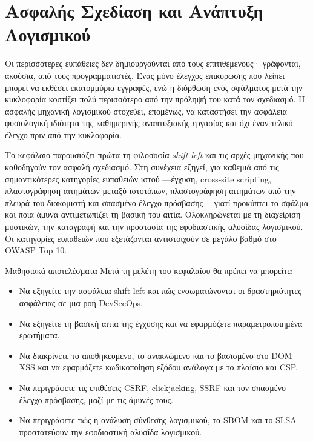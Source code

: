 \chapter{Ασφαλής Σχεδίαση και Ανάπτυξη Λογισμικού}\label{ch:9}

Οι περισσότερες ευπάθειες δεν δημιουργούνται από τους επιτιθέμενους· γράφονται, ακούσια, από τους προγραμματιστές. Ένας μόνο έλεγχος επικύρωσης που λείπει μπορεί να εκθέσει εκατομμύρια εγγραφές, ενώ η διόρθωση ενός σφάλματος μετά την κυκλοφορία κοστίζει πολύ περισσότερο από την πρόληψή του κατά τον σχεδιασμό. Η ασφαλής μηχανική λογισμικού στοχεύει, επομένως, να καταστήσει την ασφάλεια φυσιολογική ιδιότητα της καθημερινής αναπτυξιακής εργασίας και όχι έναν τελικό έλεγχο πριν από την κυκλοφορία.

Το κεφάλαιο παρουσιάζει πρώτα τη φιλοσοφία \emph{shift-left} και τις αρχές μηχανικής που καθοδηγούν τον ασφαλή σχεδιασμό. Στη συνέχεια εξηγεί, για καθεμιά από τις σημαντικότερες κατηγορίες ευπαθειών ιστού —έγχυση, cross-site scripting, πλαστογράφηση αιτημάτων μεταξύ ιστοτόπων, πλαστογράφηση αιτημάτων από την πλευρά του διακομιστή και σπασμένο έλεγχο πρόσβασης— γιατί προκύπτει το σφάλμα και ποια άμυνα αντιμετωπίζει τη βασική του αιτία. Ολοκληρώνεται με τη διαχείριση μυστικών, την καταγραφή και την προστασία της εφοδιαστικής αλυσίδας λογισμικού. Οι κατηγορίες ευπαθειών που εξετάζονται αντιστοιχούν σε μεγάλο βαθμό στο OWASP Top 10.

\begin{outcomesbox}{Μαθησιακά αποτελέσματα}
Μετά τη μελέτη του κεφαλαίου θα πρέπει να μπορείτε:
\begin{itemize}
  \item Να εξηγείτε την ασφάλεια shift-left και πώς ενσωματώνονται οι δραστηριότητες ασφάλειας σε μια ροή DevSecOps.
  \item Να εξηγείτε τη βασική αιτία της έγχυσης και να εφαρμόζετε παραμετροποιημένα ερωτήματα.
  \item Να διακρίνετε το αποθηκευμένο, το ανακλώμενο και το βασισμένο στο DOM XSS και να εφαρμόζετε κωδικοποίηση εξόδου ανάλογα με το πλαίσιο και CSP.
  \item Να περιγράφετε τις επιθέσεις CSRF, clickjacking, SSRF και τον σπασμένο έλεγχο πρόσβασης, μαζί με τις άμυνές τους.
  \item Να περιγράφετε πώς η ανάλυση σύνθεσης λογισμικού, τα SBOM και το SLSA προστατεύουν την εφοδιαστική αλυσίδα λογισμικού.
\end{itemize}
\end{outcomesbox}

